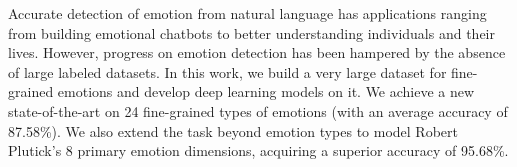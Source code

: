 Accurate detection of emotion from natural language has applications ranging from building emotional chatbots to better understanding individuals and their lives. However, progress on emotion detection has been hampered by the absence of large labeled datasets.  In this work, we build a very large dataset for fine-grained emotions and develop deep learning models on it. We achieve a new state-of-the-art on 24 fine-grained types of emotions (with an average accuracy of 87.58\%). We also extend the task beyond emotion types to model Robert Plutick's 8 primary emotion dimensions, acquiring a superior accuracy of 95.68\%.
